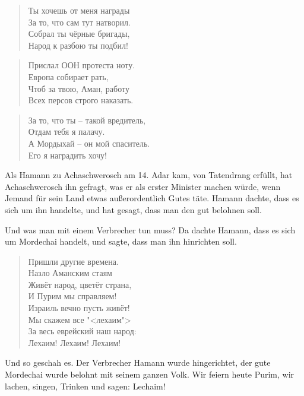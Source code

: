 \documentclass[12pt,a4paper,titlepage]{article}
\begin{document}
\begin{drama}
\ahspeaks {}
\begin{verse}
Ты хочешь от меня награды\\
За то, что сам тут натворил.\\
Собрал ты чёрные бригады,\\
Народ к разбою ты подбил!\\
\end{verse}

\begin{verse}
Прислал ООН протеста ноту.\\
Европа собирает рать,\\
Чтоб за твою, Аман, работу\\
Всех персов строго наказать.\\
\end{verse}

\begin{verse}
За то, что ты -- такой вредитель,\\
Отдам тебя я палачу.\\
А Мордыхай -- он мой спаситель.\\
Его я наградить хочу!\\
\end{verse}


\uespeaks
Als Hamann zu Achaschwerosch am 14. Adar kam, von Tatendrang  erfüllt,
hat Achaschwerosch ihn gefragt, was er als erster Minister machen würde,
wenn Jemand für sein Land etwas außerordentlich Gutes täte. Hamann dachte,
dass es sich um ihn handelte, und hat gesagt, dass man den gut belohnen soll.
\par Und was man mit einem Verbrecher tun muss? Da dachte Hamann, dass es sich
um Mordechai handelt, und sagte, dass man ihn hinrichten soll.


\scene


\mspeaks
\begin{verse}
Пришли другие времена.\\
Назло Аманским стаям\\
Живёт народ, цветёт страна,\\
И Пурим мы справляем!\\
Израиль  вечно пусть живёт!\\
Мы скажем все "<лехаим">\\
За весь еврейский наш народ:\\
Лехаим! Лехаим! Лехаим!\\
\end{verse}


\uespeaks
Und so geschah es. Der Verbrecher Hamann wurde hingerichtet,
der gute Mordechai wurde belohnt mit seinem ganzen Volk. 
Wir feiern heute Purim, wir lachen, singen, Trinken und sagen: Lechaim!


\end{drama}
\end{document}
